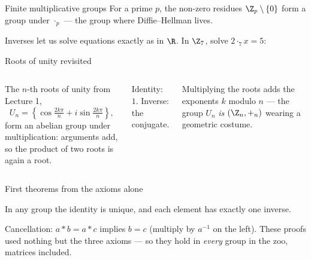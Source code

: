 \begin{frame}{Finite multiplicative groups}
For a prime $p$, the non-zero residues $\Z_p \setminus \{0\}$ form a group
under $\cdot_p$ — the group where Diffie--Hellman lives.

\pause

Inverses let us solve equations exactly as in $\R$. In $\Z_7$, solve
$2 \cdot_7 x = 5$:

\begin{steps}
\end{steps}
\end{frame}

\begin{frame}{Roots of unity revisited}
\begin{columns}
\column
The $n$-th roots of unity from Lecture 1,
\[
U_n = \left\{ \cos\tfrac{2k\pi}{n} + i \sin\tfrac{2k\pi}{n} \right\},
\]
form an abelian group under multiplication: arguments add, so the product of
two roots is again a root.

Identity: $1$. Inverse: the conjugate.

\pause

Multiplying the roots adds the exponents $k$ modulo $n$ — the group $U_n$
\emph{is} $(\Z_n, +_n)$ wearing a geometric costume.
\column
{}
\end{columns}
\end{frame}

\begin{frame}{First theorems from the axioms alone}
\begin{fact}
In any group the identity is unique, and each element has exactly one inverse.
\end{fact}

\begin{steps}
\end{steps}

\pause

\begin{fact}
Cancellation: $a * b = a * c$ implies $b = c$ (multiply by $a^{-1}$ on the
left). These proofs used nothing but the three axioms — so they hold in
\emph{every} group in the zoo, matrices included.
\end{fact}
\end{frame}

